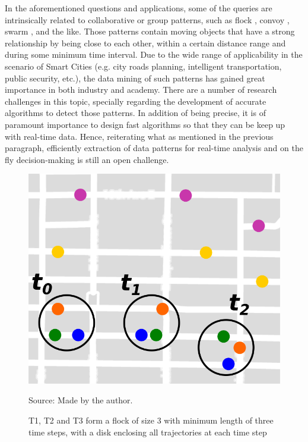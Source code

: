 In the aforementioned questions and applications, some of the queries are intrinsically related to collaborative or
group patterns, such as flock \citep{gudefficient}, convoy \citep{convoy}, swarm \citep{swarm}, and the like. Those
patterns contain moving objects that have a strong relationship by being close to each other, within a certain distance
range and during some minimum time interval. Due to the wide range of applicability in the scenario of Smart Cities
(e.g. city roads planning, intelligent transportation, public security, etc.), the data mining of such patterns has
gained great importance in both industry and academy. There are a number of research challenges in this topic, specially
regarding the development of accurate algorithms to detect those patterns. In addition of being precise, it is of
paramount importance to design fast algorithms so that they can be keep up with real-time data. Hence, reiterating what
as mentioned in the previous paragraph, efficiently extraction of data patterns for real-time analysis and on the fly
decision-making is still an open challenge.
%
%

\begin{figure}[h!]
    \centering
    \caption{T1, T2 and T3 form a flock of size 3 with minimum length of three time steps, with a disk enclosing all
        trajectories at each time step}
    \centerline{\includegraphics[width=0.7\linewidth]{images/flock_pattern.png}}
    \footnotesize{Source: Made by the author.}
    \label{fig:flocks}
\end{figure}

